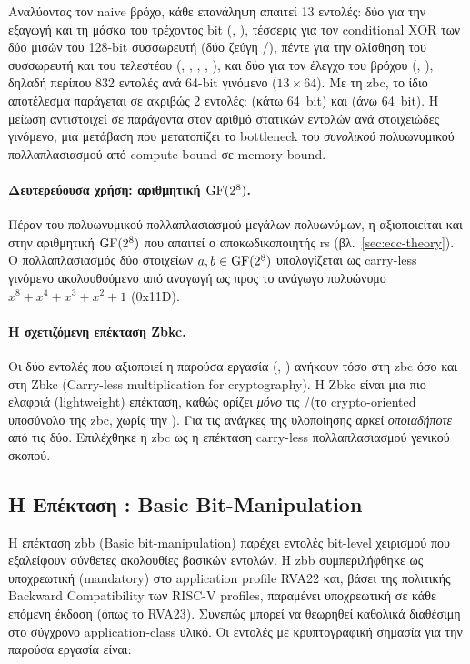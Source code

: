 Αναλύοντας τον naive βρόχο, κάθε επανάληψη απαιτεί \num{13} εντολές: δύο για
την εξαγωγή και τη μάσκα του τρέχοντος bit (, ), τέσσερις
για τον conditional XOR των δύο μισών του 128-bit συσσωρευτή (δύο ζεύγη
/), πέντε για την ολίσθηση του συσσωρευτή και του
τελεστέου (, , , , ), και
δύο για τον έλεγχο του βρόχου (, ), δηλαδή περίπου
\num{832} εντολές ανά 64-bit γινόμενο ($13 \times 64$). Με τη \gls{zbc}, το
ίδιο αποτέλεσμα παράγεται σε ακριβώς \num{2} εντολές: \clmul (κάτω 64~bit) και
\clmulh (άνω 64~bit). Η μείωση αντιστοιχεί σε παράγοντα 
στον αριθμό στατικών εντολών ανά στοιχειώδες γινόμενο, μια μετάβαση που 
μετατοπίζει το bottleneck του \emph{συνολικού} πολυωνυμικού πολλαπλασιασμού από compute-bound σε
memory-bound.

\paragraph{Δευτερεύουσα χρήση: αριθμητική $\mathrm{GF}(2^8)$.}
Πέραν του πολυωνυμικού πολλαπλασιασμού μεγάλων πολυωνύμων, η \clmul
αξιοποιείται και στην αριθμητική $\mathrm{GF}(2^8)$ που απαιτεί ο αποκωδικοποιητής
\gls{rs} (βλ.~\cref{sec:ecc-theory}). Ο πολλαπλασιασμός δύο
στοιχείων $a, b \in \mathrm{GF}(2^8)$ υπολογίζεται ως carry-less γινόμενο ακολουθούμενο
από αναγωγή ως προς το ανάγωγο πολυώνυμο $x^8 + x^4 + x^3 + x^2 + 1$ (0x11D).

\paragraph{Η σχετιζόμενη επέκταση Zbkc.}
Οι δύο εντολές που αξιοποιεί η παρούσα εργασία (\clmul, \clmulh) ανήκουν
τόσο στη \gls{zbc} όσο και στη Zbkc (Carry-less multiplication for
cryptography). Η Zbkc είναι μια πιο ελαφριά (lightweight) επέκταση, καθώς
ορίζει \emph{μόνο} τις \clmul/\clmulh (το crypto-oriented υποσύνολο της
\gls{zbc}, χωρίς την ). Για τις ανάγκες της υλοποίησης αρκεί
\emph{οποιαδήποτε} από τις δύο. Επιλέχθηκε η \gls{zbc} ως η επέκταση
carry-less πολλαπλασιασμού γενικού σκοπού.

\subsection{Η Επέκταση \Zbb: Basic Bit-Manipulation}
\label{ssec:zbb-extension}

Η επέκταση \gls{zbb} (Basic bit-manipulation) παρέχει εντολές bit-level χειρισμού που
εξαλείφουν σύνθετες ακολουθίες βασικών εντολών. Η \gls{zbb}
συμπεριλήφθηκε ως υποχρεωτική (mandatory) στο application profile RVA22
και, βάσει της πολιτικής Backward Compatibility των RISC-V profiles,
παραμένει υποχρεωτική σε κάθε επόμενη έκδοση (όπως το RVA23). Συνεπώς
μπορεί να θεωρηθεί καθολικά διαθέσιμη στο σύγχρονο application-class
υλικό. Οι εντολές με κρυπτογραφική σημασία για την παρούσα εργασία είναι:

